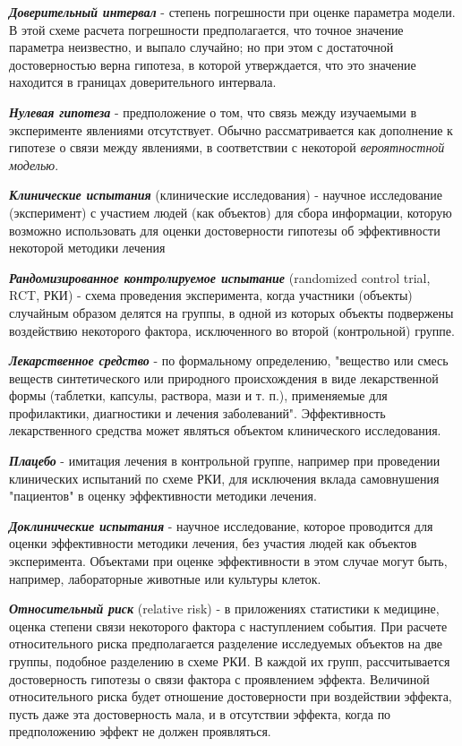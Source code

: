 \noindent
\textbf{ \textit{Доверительный интервал} } - степень погрешности при оценке параметра модели. В этой схеме расчета погрешности предполагается, что точное значение параметра неизвестно, и выпало случайно; но при этом с достаточной достоверностью верна гипотеза, в которой утверждается, что это значение находится в границах доверительного интервала.

\noindent
\textbf{ \textit{Нулевая гипотеза} } - предположение о том, что связь между изучаемыми в эксперименте явлениями отсутствует. Обычно рассматривается как дополнение к гипотезе о связи между явлениями, в соответствии с некоторой \textit{вероятностной моделью}.

\noindent
\textbf{ \textit{Клинические испытания } } (клинические исследования) - научное исследование (эксперимент) с участием людей (как объектов) для сбора информации, которую возможно использовать для оценки достоверности гипотезы об эффективности некоторой методики лечения

\noindent
\textbf{ \textit{Рандомизированное контролируемое испытание } } (randomized  control trial, RCT, РКИ) - схема проведения эксперимента, когда участники (объекты) случайным образом делятся на группы, в одной из которых объекты подвержены воздействию некоторого фактора, исключенного во второй (контрольной) группе.

\noindent
\textbf{ \textit{Лекарственное средство} } - по формальному определению, "вещество или смесь веществ синтетического или природного происхождения в виде лекарственной формы (таблетки, капсулы, раствора, мази и т. п.), применяемые для профилактики, диагностики и лечения заболеваний". Эффективность лекарственного средства может являться объектом клинического исследования.

\noindent
\textbf{ \textit{Плацебо} } - имитация лечения в контрольной группе, например при проведении клинических испытаний по схеме РКИ, для исключения вклада самовнушения "пациентов" в оценку эффективности методики лечения.

\noindent
\textbf{ \textit{Доклинические испытания } } - научное исследование, которое проводится для оценки эффективности методики лечения, без участия людей как объектов эксперимента. Объектами при оценке эффективности в этом случае могут быть, например, лабораторные животные или культуры клеток.

\noindent
\textbf{ \textit{Относительный риск} } (relative risk) - в приложениях статистики к медицине, оценка степени связи некоторого фактора с наступлением события. При расчете относительного риска предполагается разделение исследуемых объектов на две группы, подобное разделению в схеме РКИ. В каждой их групп, рассчитывается достоверность гипотезы о связи фактора с проявлением эффекта. Величиной относительного риска будет отношение достоверности при воздействии эффекта, пусть даже эта достоверность мала, и в отсутствии эффекта, когда по предположению эффект не должен проявляться.

